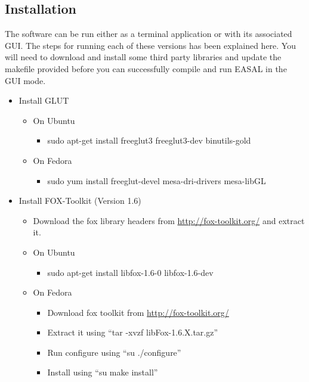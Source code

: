 \documentclass[10pt]{article}
\begin{document}
\subsection{Installation}
The software can be run either as a terminal application or with its associated GUI.
The steps for running each of these versions has been explained here. You will need to download and install some third party libraries and update the makefile provided before you can successfully compile and run EASAL in the GUI mode.  
\begin{itemize}
	\item Install GLUT 
	  \begin{itemize}
	  \item On Ubuntu 
	  	  \begin{itemize}
	  	  	\item sudo apt-get install freeglut3 freeglut3-dev binutils-gold
		  \end{itemize}
	 \item On Fedora
	 \begin{itemize}
	  	  \item sudo yum install freeglut-devel mesa-dri-drivers mesa-libGL 
\end{itemize}
	  \end{itemize}
     \item Install FOX-Toolkit (Version 1.6)
	   \begin{itemize}
		   \item Download the fox library headers from \url{http://fox-toolkit.org/} and extract it.
		   \item On Ubuntu
		   \begin{itemize}
	   	   		\item sudo apt-get install libfox-1.6-0 libfox-1.6-dev
			\end{itemize}
		   \item On Fedora
		   	\begin{itemize}
		   		\item Download fox toolkit from \url{http://fox-toolkit.org/}
				\item Extract it using ``tar -xvzf libFox-1.6.X.tar.gz''
				\item Run configure using ``su ./configure''
				\item Install using ``su make install''
			\end{itemize}


\end{itemize}
\end{itemize}
\end{document}
